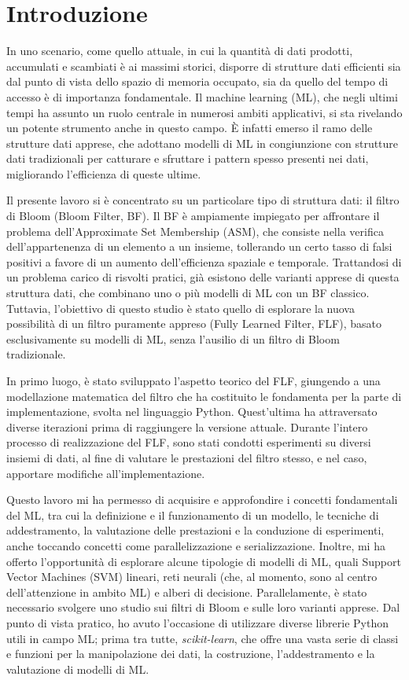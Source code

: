 \chapter{Introduzione}

In uno scenario, come quello attuale, in cui la quantità di dati prodotti, accumulati e scambiati è ai massimi storici, disporre di strutture dati efficienti sia dal punto di vista dello spazio di memoria occupato, sia da quello del tempo di accesso è di importanza fondamentale. 
Il machine learning (ML), che negli ultimi tempi ha assunto un ruolo centrale in numerosi ambiti applicativi, si sta rivelando un potente strumento anche in questo campo. È infatti emerso il ramo delle strutture dati apprese, che adottano modelli di ML in congiunzione con strutture dati tradizionali per catturare e sfruttare i pattern spesso presenti nei dati, migliorando l'efficienza di queste ultime.

Il presente lavoro si è concentrato su un particolare tipo di struttura dati: il filtro di Bloom (Bloom Filter, BF). Il BF è ampiamente impiegato per affrontare il problema dell'Approximate Set Membership (ASM), che consiste nella verifica dell'appartenenza di un elemento a un insieme, tollerando un certo tasso di falsi positivi a favore di un aumento dell'efficienza spaziale e temporale. Trattandosi di un problema carico di risvolti pratici, già esistono delle varianti apprese di questa struttura dati, che combinano uno o più modelli di ML con un BF classico. Tuttavia, l'obiettivo di questo studio è stato quello di esplorare la nuova possibilità di un filtro puramente appreso (Fully Learned Filter, FLF), basato esclusivamente su modelli di ML, senza l'ausilio di un filtro di Bloom tradizionale.

In primo luogo, è stato sviluppato l'aspetto teorico del FLF, giungendo a una modellazione matematica del filtro che ha costituito le fondamenta per la parte di implementazione, svolta nel linguaggio Python. Quest'ultima ha attraversato diverse iterazioni prima di raggiungere la versione attuale. Durante l'intero processo di realizzazione del FLF, sono stati condotti esperimenti su diversi insiemi di dati, al fine di valutare le prestazioni del filtro stesso, e nel caso, apportare modifiche all’implementazione.

Questo lavoro mi ha permesso di acquisire e approfondire i concetti fondamentali del ML, tra cui la definizione e il funzionamento di un modello, le tecniche di addestramento, la valutazione delle prestazioni e la conduzione di esperimenti, anche toccando concetti come parallelizzazione e serializzazione. Inoltre, mi ha offerto l'opportunità di esplorare alcune tipologie di modelli di ML, quali Support Vector Machines (SVM) lineari, reti neurali (che, al momento, sono al centro dell'attenzione in ambito ML) e alberi di decisione. Parallelamente, è stato necessario svolgere uno studio sui filtri di Bloom e sulle loro varianti apprese.
Dal punto di vista pratico, ho avuto l'occasione di utilizzare diverse librerie Python utili in campo ML; prima tra tutte, \textit{scikit-learn}, che offre una vasta serie di classi e funzioni per la manipolazione dei dati, la costruzione, l’addestramento e la valutazione di modelli di ML.


